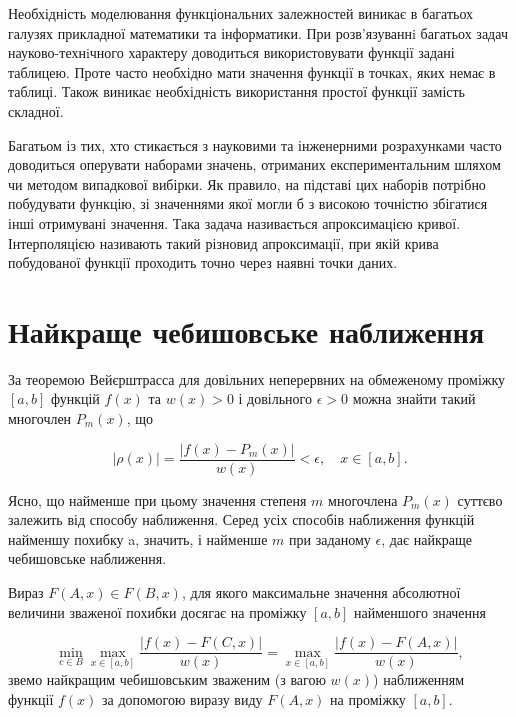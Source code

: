 \documentclass[ukrainian,14pt]{extarticle}
\begin{document}
Необхідність моделювання функціональних залежностей виникає в багатьох галузях прикладної математики та інформатики. При розв’язуваннi багатьох задач науково-технiчного характеру доводиться використовувати функції задані таблицею. Проте часто необхідно мати значення функції в точках, яких немає в таблиці. Також виникає необхідність використання простої функції замість складної. 


Багатьом із тих, хто стикається з науковими та інженерними розрахунками часто доводиться оперувати наборами значень, отриманих експериментальним шляхом чи методом випадкової вибірки. Як правило, на підставі цих наборів потрібно побудувати функцію, зі значеннями якої могли б з високою точністю збігатися інші отримувані значення. Така задача називається апроксимацією кривої. Інтерполяцією називають такий різновид апроксимації, при якій крива побудованої функції проходить точно через наявні точки даних.

\newpage


\section{Найкраще чебишовське наближення}

За теоремою Вейєрштрасса для довільних неперервних на обмеженому проміжку $[a,b]$   
функцій $f(x)$ та $w(x) > 0$ і довільного $\epsilon > 0$ можна знайти такий многочлен $P_m(x)$, що

$$|\rho(x)| = \frac{|f(x) - P_m(x)|}{w(x)} < \epsilon, \quad x \in [a,b].$$

Ясно, що найменше при цьому значення степеня $m$ многочлена $P_m(x)$ суттєво залежить від способу наближення. Серед усіх способів наближення функцій найменшу похибку a, значить, і найменше $m$ при заданому $\epsilon$, дає найкраще чебишовське наближення.

Вираз $F(A,x) \in F(B,x)$, для якого максимальне значення абсолютної величини зваженої похибки досягає на проміжку $[a,b]$ найменшого значення

\begin{equation}\label{eq:formula4}
\min_{c \in B} \max_{x \in [a,b]} \frac{|f(x) - F(C,x)|}{w(x)} = \max_{x \in [a,b]} \frac{|f(x) - F(A,x)|}{w(x)},
\end{equation}
звемо найкращим чебишовським зваженим (з вагою $w(x)$) наближенням функції $f(x)$ за допомогою виразу виду $F(A,x)$ на проміжку $[a,b]$.
\end{document}
